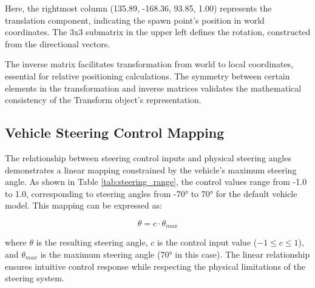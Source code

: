 Here, the rightmost column (135.89, -168.36, 93.85, 1.00) represents the translation component, indicating the spawn point's position in world coordinates. The 3x3 submatrix in the upper left defines the rotation, constructed from the directional vectors.

The inverse matrix facilitates transformation from world to local coordinates, essential for relative positioning calculations. The symmetry between certain elements in the transformation and inverse matrices validates the mathematical consistency of the Transform object's representation.

\subsection{Vehicle Steering Control Mapping}

The relationship between steering control inputs and physical steering angles demonstrates a linear mapping constrained by the vehicle's maximum steering angle. As shown in Table \ref{tab:steering_range}, the control values range from -1.0 to 1.0, corresponding to steering angles from -70° to 70° for the default vehicle model. This mapping can be expressed as:

\begin{equation}
\theta = c \cdot \theta_{max}
\end{equation}

where $\theta$ is the resulting steering angle, $c$ is the control input value ($-1 \leq c \leq 1$), and $\theta_{max}$ is the maximum steering angle (70° in this case). The linear relationship ensures intuitive control response while respecting the physical limitations of the steering system.

